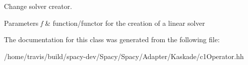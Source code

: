 \-Change solver creator. 


\begin{DoxyParams}{\-Parameters}
{\em f} & function/functor for the creation of a linear solver \\
\hline
\end{DoxyParams}


\-The documentation for this class was generated from the following file\-:\begin{DoxyCompactItemize}
\item 
/home/travis/build/spacy-\/dev/\-Spacy/\-Spacy/\-Adapter/\-Kaskade/c1\-Operator.\-hh\end{DoxyCompactItemize}
